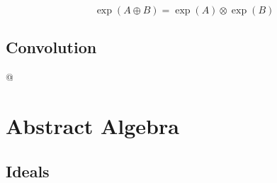 \documentclass[]{article}
\begin{document}
\begin{easylist}[itemize]
{  \begin{equation*}
  \exp(A \oplus B) = \exp(A) \otimes \exp(B)
  \end{equation*}
}
\end{easylist}

\subsection{Convolution}

\begin{easylist}[itemize]
@
\end{easylist}


\section{Abstract Algebra}

\subsection{Ideals}
\end{document}
